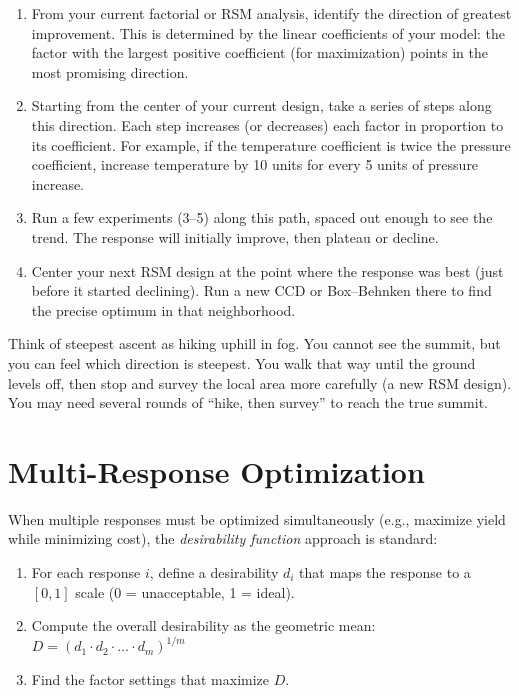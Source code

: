 \documentclass[11pt]{book}
\begin{document}
\begin{enumerate}[nosep]
\item From your current factorial or RSM analysis, identify the direction of
      greatest improvement. This is determined by the linear coefficients of
      your model: the factor with the largest positive coefficient (for
      maximization) points in the most promising direction.
\item Starting from the center of your current design, take a series of steps
      along this direction. Each step increases (or decreases) each factor in
      proportion to its coefficient. For example, if the temperature coefficient
      is twice the pressure coefficient, increase temperature by 10 units for
      every 5 units of pressure increase.
\item Run a few experiments (3--5) along this path, spaced out enough to see
      the trend. The response will initially improve, then plateau or decline.
\item Center your next RSM design at the point where the response was best
      (just before it started declining). Run a new CCD or Box--Behnken there
      to find the precise optimum in that neighborhood.
\end{enumerate}

\begin{keypoint}
Think of steepest ascent as hiking uphill in fog. You cannot see the summit, but
you can feel which direction is steepest. You walk that way until the ground
levels off, then stop and survey the local area more carefully (a new RSM
design). You may need several rounds of ``hike, then survey'' to reach the true
summit.
\end{keypoint}


\section{Multi-Response Optimization}

When multiple responses must be optimized simultaneously (e.g., maximize yield
while minimizing cost), the \emph{desirability function} approach is standard:

\begin{enumerate}[nosep]
\item For each response $i$, define a desirability $d_i$ that maps the response
      to a $[0, 1]$ scale (0 = unacceptable, 1 = ideal).
\item Compute the overall desirability as the geometric mean:
      $D = (d_1 \cdot d_2 \cdot \ldots \cdot d_m)^{1/m}$
\item Find the factor settings that maximize $D$.
\end{enumerate}
\end{document}
